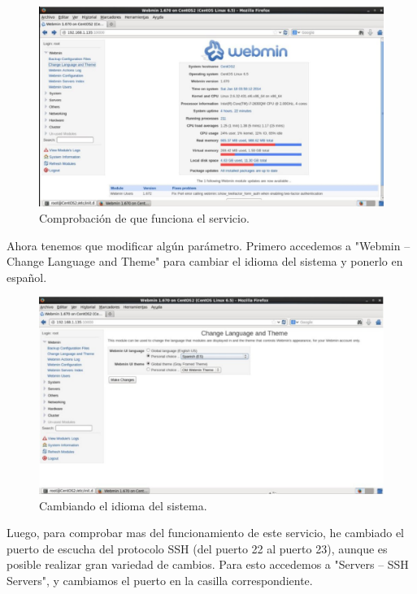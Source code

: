 \begin{figure}[H]
\begin{center}
\includegraphics[scale=0.3]{Imagenes/pregunta15-5.eps}
\caption{Comprobación de que funciona el servicio.}
\end{center}
\end{figure}


Ahora tenemos que modificar algún parámetro.
Primero accedemos a "Webmin -- Change Language and Theme" para cambiar el idioma del sistema y ponerlo en español.

\begin{figure}[H]
\begin{center}
\includegraphics[scale=0.3]{Imagenes/pregunta15-6.eps}
\caption{Cambiando el idioma del sistema.}
\end{center}
\end{figure}

Luego, para comprobar mas del funcionamiento de este servicio, he cambiado el puerto de escucha del protocolo SSH (del puerto 22 al puerto 23), aunque es posible realizar gran variedad de cambios.
Para esto accedemos a "Servers -- SSH Servers", y cambiamos el puerto en la casilla correspondiente.

